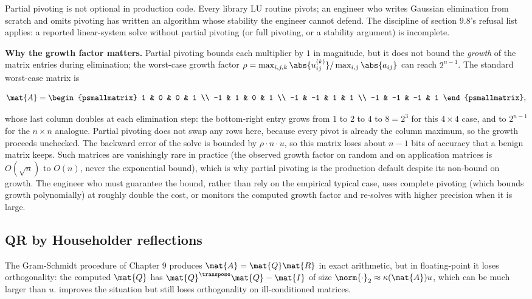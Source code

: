 Partial pivoting is not optional in production code. Every
library LU routine pivots; an engineer who writes Gaussian
elimination from scratch and omits pivoting has written an
algorithm whose stability the engineer cannot defend. The
discipline of section 9.8's refusal list applies: a reported
linear-system solve without partial pivoting (or full pivoting,
or a stability argument) is incomplete.

\begin{example}
\textbf{Why the growth factor matters.} Partial pivoting bounds each
multiplier by $1$ in magnitude, but it does not bound the
\emph{growth} of the matrix entries during elimination; the
worst-case growth factor $\rho = \max_{i,j,k}\abs{u_{ij}^{(k)}} /
\max_{i,j}\abs{a_{ij}}$ can reach $2^{n-1}$. The standard worst-case
matrix is

\[
\mat{A} = \begin{psmallmatrix}
1 & 0 & 0 & 1 \\
-1 & 1 & 0 & 1 \\
-1 & -1 & 1 & 1 \\
-1 & -1 & -1 & 1
\end{psmallmatrix},
\]

whose last column doubles at each elimination step: the bottom-right
entry grows from $1$ to $2$ to $4$ to $8 = 2^{3}$ for this $4 \times
4$ case, and to $2^{n-1}$ for the $n \times n$ analogue. Partial
pivoting does not swap any rows here, because every pivot is already
the column maximum, so the growth proceeds unchecked. The backward
error of the solve is bounded by $\rho \cdot n \cdot u$, so this
matrix loses about $n - 1$ bits of accuracy that a benign matrix
keeps. Such matrices are vanishingly rare in practice (the observed
growth factor on random and on application matrices is $O(\sqrt{n})$
to $O(n)$, never the exponential bound), which is why partial
pivoting is the production default despite its non-bound on growth.
The engineer who must guarantee the bound, rather than rely on the
empirical typical case, uses complete pivoting (which bounds growth
polynomially) at roughly double the cost, or monitors the computed
growth factor and re-solves with higher precision when it is large.
\end{example}

\subsection{QR by Householder reflections}

The Gram-Schmidt procedure of Chapter 9 produces $\mat{A} =
\mat{Q}\mat{R}$ in exact arithmetic, but in floating-point it
loses orthogonality: the computed $\mat{Q}$ has $\mat{Q}^{\transpose}
\mat{Q} - \mat{I}$ of size $\norm{\cdot}_{2} \approx \kappa(\mat{A})
u$, which can be much larger than $u$.  improves the situation but still loses orthogonality
on ill-conditioned matrices.

